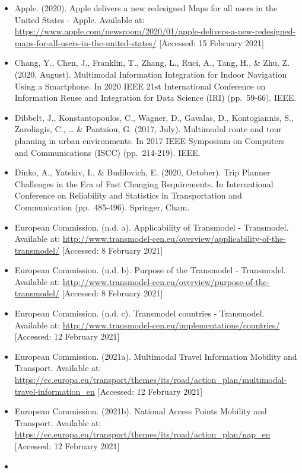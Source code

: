 \documentclass[
]{book}
\providecommand{\tightlist}{%
  \setlength{\itemsep}{0pt}\setlength{\parskip}{0pt}}
\begin{document}
\begin{itemize}
\tightlist
\item
  Apple. (2020). Apple delivers a new redesigned Maps for all users in the United States - Apple. Available at: \url{https://www.apple.com/newsroom/2020/01/apple-delivers-a-new-redesigned-maps-for-all-users-in-the-united-states/} {[}Accessed: 15 February 2021{]}
\item
  Chang, Y., Chen, J., Franklin, T., Zhang, L., Ruci, A., Tang, H., \& Zhu, Z. (2020, August). Multimodal Information Integration for Indoor Navigation Using a Smartphone. In 2020 IEEE 21st International Conference on Information Reuse and Integration for Data Science (IRI) (pp.~59-66). IEEE.
\item
  Dibbelt, J., Konstantopoulos, C., Wagner, D., Gavalas, D., Kontogiannis, S., Zaroliagis, C., \ldots{} \& Pantziou, G. (2017, July). Multimodal route and tour planning in urban environments. In 2017 IEEE Symposium on Computers and Communications (ISCC) (pp.~214-219). IEEE.
\item
  Dinko, A., Yatskiv, I., \& Budilovich, E. (2020, October). Trip Planner Challenges in the Era of Fast Changing Requirements. In International Conference on Reliability and Statistics in Transportation and Communication (pp.~485-496). Springer, Cham.
\item
  European Commission. (n.d. a). Applicability of Transmodel - Transmodel. Available at: \url{http://www.transmodel-cen.eu/overview/applicability-of-the-transmodel/} {[}Accessed: 8 February 2021{]}
\item
  European Commission. (n.d. b). Purpose of the Transmodel - Transmodel. Available at: \url{http://www.transmodel-cen.eu/overview/purpose-of-the-transmodel/} {[}Accessed: 8 February 2021{]}
\item
  European Commission. (n.d. c). Transmodel countries - Transmodel. Available at: \url{http://www.transmodel-cen.eu/implementations/countries/} {[}Accessed: 12 February 2021{]}
\item
  European Commission. (2021a). Multimodal Travel Information \textbar{} Mobility and Transport. Available at: \url{https://ec.europa.eu/transport/themes/its/road/action_plan/multimodal-travel-information_en} {[}Accessed: 12 February 2021{]}
\item
  European Commission. (2021b). National Access Points \textbar{} Mobility and Transport. Available at: \url{https://ec.europa.eu/transport/themes/its/road/action_plan/nap_en} {[}Accessed: 12 February 2021{]}
\item

\end{itemize}
\end{document}

